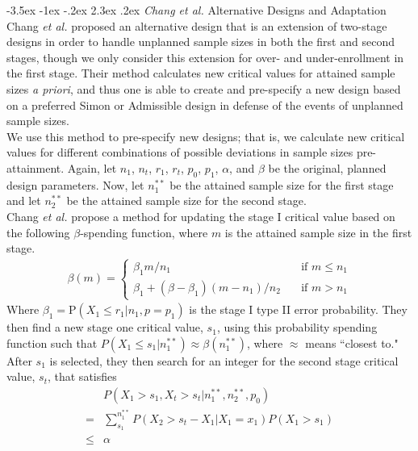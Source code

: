 \documentclass[12pt]{report}\usepackage[]{graphicx}\usepackage[]{color}
\makeatletter
\newlength{\li}\setlength{\li}{14.48pt}
\newlength{\di}\setlength{\di}{-3.5mm}
\renewcommand\section{ \@startsection {section}{1}{\z@}%
                                   {-3.5ex \@plus -1ex \@minus -.2ex}%
                                   {2.3ex \@plus.2ex}%
                                   {\centering\large\fontfamily{qcs}\selectfont}}
\makeatother
\begin{document}
\section{\textit{Chang et al.} Alternative Designs and Adaptation}
Chang \textit{et al.} \cite{Chang} proposed an alternative design that is an extension of two-stage designs in order to handle unplanned sample sizes in both the first and second stages, though we only consider this extension for over- and under-enrollment in the first stage. Their method calculates new critical values for attained sample sizes \textit{a priori}, and thus one is able to create and pre-specify a new design based on a preferred Simon or Admissible design in defense of the events of unplanned sample sizes.\\
\indent We use this method to pre-specify new designs; that is, we calculate new critical values for different combinations of possible deviations in sample sizes pre-attainment. Again, let $n_1$, $n_t$, $r_1$, $r_t$, $p_0$, $p_1$, $\alpha$, and $\beta$ be the original, planned design parameters. Now, let $n_1^{\ast \ast}$ be the attained sample size for the first stage and let $n_2^{\ast\ast}$ be the attained sample size for the second stage. \\
\indent Chang \textit{et al.} propose a method for updating the stage I critical value based on the following $\beta$-spending function, where $m$ is the attained sample size in the first stage.
\begin{equation}
\begin{aligned}
\beta(m) = \left\{
        \begin{array}{ll}
            \beta_1 m/n_1 & \quad \text{if } m\leq n_1 \\
            \beta_1 + (\beta - \beta_1)(m - n_1)/n_2 & \quad \text{if } m > n_1
        \end{array}
    \right.
\end{aligned}
\end{equation}
Where $\beta_1 = \mbox{P}(X_1 \leq r_1 \vert n_1, p = p_1)$ is the stage I type II error probability.
They then find a new stage one critical value, $s_1$, using this probability spending function such that $P(X_1 \leq s_1 | n_1^{\ast\ast}) \approx \beta(n_1^{\ast\ast})$, where $\approx$ means ``closest to." After $s_1$ is selected, they then search for an integer for the second stage critical value, $s_t$, that satisfies
\begin{equation}
\begin{aligned}
& P(X_1 > s_1, X_t > s_t | n_1^{\ast\ast}, n_2^{\ast\ast}, p_0) \\
= & \sum_{s_1}^{n_1^{\ast\ast}} P(X_2 > s_t - X_1 | X_1 = x_1) P(X_1 > s_1) \\
 \leq & \alpha \\
\end{aligned}
\end{equation}
\end{document}
